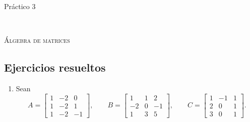 \documentclass[12pt,reqno]{amsart}
\begin{document}



\centerline{\Large{Pr\' actico 3}}

\

\centerline{\textsc{\'Algebra de matrices}}

\subsection*{Ejercicios resueltos}

\begin{enumerate}[topsep=6pt,itemsep=6pt]


\item\label{ej} Sean
$$
A= \begin{bmatrix} 1&-2&0\\ 1&-2&1\\ 1&-2&-1\end{bmatrix},\quad
\quad B= \begin{bmatrix}1&1&2\\ -2&0&-1\\ 1&3&5 \end{bmatrix},
\quad\quad C=\begin{bmatrix}1&-1&1\\ 2&0&1\\ 3&0&1 \end{bmatrix}.
$$


\end{enumerate}
\end{document}
